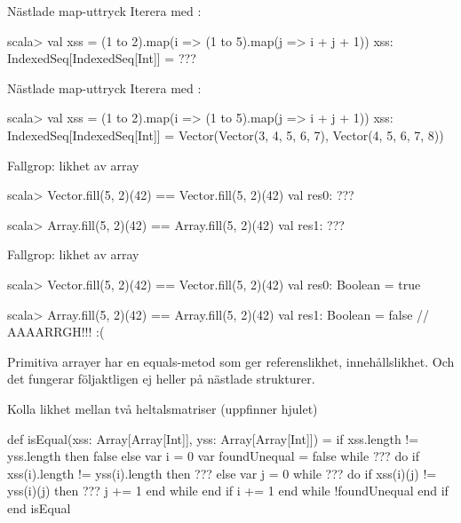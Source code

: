 \begin{Slide}{Nästlade map-uttryck}\SlideFontSmall
Iterera med :\\
\begin{REPL}
scala> val xss = (1 to 2).map(i => (1 to 5).map(j => i + j + 1))
xss: IndexedSeq[IndexedSeq[Int]] =
      ???
\end{REPL}
\end{Slide}

\begin{Slide}{Nästlade map-uttryck}\SlideFontSmall
Iterera med :\\
\begin{REPL}
scala> val xss = (1 to 2).map(i => (1 to 5).map(j => i + j + 1))
xss: IndexedSeq[IndexedSeq[Int]] =
      Vector(Vector(3, 4, 5, 6, 7), Vector(4, 5, 6, 7, 8))
\end{REPL}
\end{Slide}



\ifkompendium\else
\begin{Slide}{Fallgrop: likhet av array}
\begin{REPL}
scala> Vector.fill(5, 2)(42) == Vector.fill(5, 2)(42)
val res0: ???

scala> Array.fill(5, 2)(42) == Array.fill(5, 2)(42)
val res1: ???
\end{REPL}
\end{Slide}
\fi

\begin{Slide}{Fallgrop: likhet av array}
\begin{REPL}
scala> Vector.fill(5, 2)(42) == Vector.fill(5, 2)(42)
val res0: Boolean = true

scala> Array.fill(5, 2)(42) == Array.fill(5, 2)(42)
val res1: Boolean = false  // AAAARRGH!!! :(
\end{REPL}
Primitiva arrayer har en equals-metod som ger referenslikhet,  innehållslikhet. Och det fungerar följaktligen ej heller på nästlade strukturer. 
\end{Slide}

\ifkompendium\else
\begin{Slide}{Kolla likhet mellan två heltalsmatriser (uppfinner hjulet)}
\begin{CodeSmall}
def isEqual(xss: Array[Array[Int]], yss: Array[Array[Int]]) = 
  if xss.length != yss.length then false else
    var i = 0
    var foundUnequal = false
    while ??? do
      if xss(i).length != yss(i).length then 
        ???
      else 
        var j = 0
        while ??? do
          if xss(i)(j) != yss(i)(j) then ???
          j += 1
        end while
      end if
      i += 1
    end while
    !foundUnequal
  end if
end isEqual
\end{CodeSmall}
\end{Slide}
\fi



